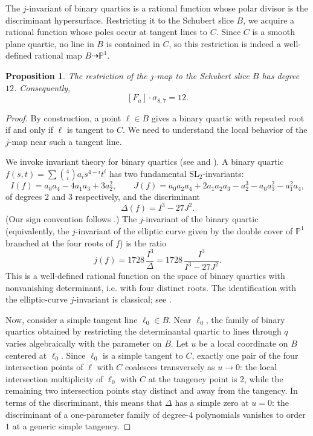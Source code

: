\documentclass[11pt]{article}
\newtheorem{proposition}[theorem]{Proposition}
\newcommand{\Pj}{\mathbb P}
\begin{document}
The $j$-invariant of binary quartics is a rational function whose polar divisor is the discriminant hypersurface. Restricting it to the Schubert slice $B$, we acquire a rational function whose poles occur at tangent lines to $C$. Since $C$ is a smooth plane quartic, no line in $B$ is contained in $C$, so this restriction is indeed a well-defined rational map $B\dashrightarrow \Pj^1$.

\begin{proposition}\label{prop:degree-on-slice}
The restriction of the $j$-map to the Schubert slice $B$ has degree $12$. Consequently,
\[
[F_a]\cdot \sigma_{8,7}=12.
\]
\end{proposition}

\begin{proof}
By construction, a point $\ell\in B$ gives a binary quartic with repeated root if and only if $\ell$ is tangent to $C$. We need to understand the local behavior of the $j$-map near such a tangent line.

We invoke invariant theory for binary quartics (see \cite[Chapter~III, \S1]{Silverman} and \cite[\S6.3]{Dolgachev}).
A binary quartic $f(s,t)=\sum \binom{4}{i}a_is^{4-i}t^i$ has two fundamental $\mathrm{SL}_2$-invariants:
\[
I(f) = a_0a_4 - 4a_1a_3 + 3a_2^2, \qquad
J(f) = a_0a_2a_4 + 2a_1a_2a_3 - a_2^3 - a_0a_3^2 - a_1^2a_4,
\]
of degrees $2$ and $3$ respectively, and the discriminant
\[
\Delta(f) = I^3 - 27 J^2.
\]
(Our sign convention follows \cite[\S6.3.4]{Dolgachev}.) The $j$-invariant of the binary quartic (equivalently, the $j$-invariant of the elliptic curve given by the double cover of $\Pj^1$ branched at the four roots of $f$) is the ratio
\begin{equation}\label{eq:j-binary-quartic}
j(f) = 1728\,\frac{I^3}{\Delta} = 1728\,\frac{I^3}{I^3 - 27J^2}.
\end{equation}
This is a well-defined rational function on the space of binary quartics with nonvanishing determinant, i.e. with four distinct roots. The identification with the elliptic-curve $j$-invariant is classical; see \cite[Proposition~III.1.7]{Silverman}.

Now, consider a simple tangent line $\ell_0\in B$. Near $\ell_0$, the family of binary quartics obtained by restricting the determinantal quartic to lines through $q$ varies algebraically with the parameter on $B$. Let $u$ be a local coordinate on $B$ centered at $\ell_0$. Since $\ell_0$ is a simple tangent to $C$, exactly one pair of the four intersection points of $\ell$ with $C$ coalesces transversely as $u\to 0$: the local intersection multiplicity of $\ell_0$ with $C$ at the tangency point is $2$, while the remaining two intersection points stay distinct and away from the tangency. In terms of the discriminant, this means that $\Delta$ has a simple zero at $u=0$: the discriminant of a one-parameter family of degree-$4$ polynomials vanishes to order $1$ at a generic simple tangency.


\end{proof}
\end{document}
